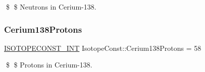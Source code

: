 \$ \$ Neutrons in Cerium-\/138. \mbox{\label{group___isotope_const-_cerium-_ce138_ga7e8c82dcea217201d462cc86296050b9}} 
\subsubsection{\texorpdfstring{Cerium138\+Protons}{Cerium138Protons}}
{\footnotesize\ttfamily \mbox{\hyperlink{group___isotope_const-_macros_ga5f18360b3e99483a35c32d789e62621c}{I\+S\+O\+T\+O\+P\+E\+C\+O\+N\+S\+T\+\_\+\+I\+NT}} Isotope\+Const\+::\+Cerium138\+Protons = 58}

\$ \$ Protons in Cerium-\/138. 